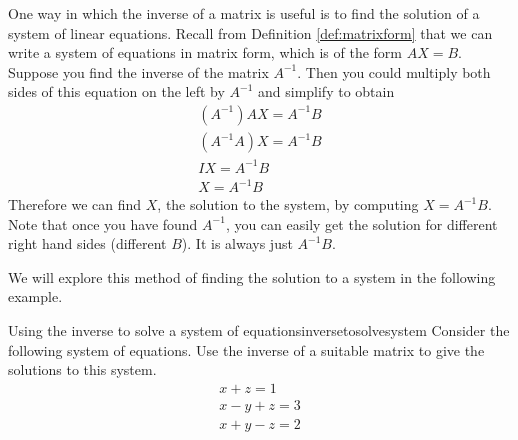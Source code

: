 One way in which the inverse of a matrix is useful is to find the solution of a system of linear equations.
Recall from Definition \ref{def:matrixform} that we can write a system of equations in matrix form, 
which is of the form $AX=B$. Suppose you find the
inverse of the matrix $A^{-1}$. Then you could multiply both sides of this
equation on the left by $A^{-1}$ and simplify to obtain
\begin{equation*}
\begin{array}{c}
\left( A^{-1} \right) AX =A^{-1}B \\
\left(A^{-1}A\right) X = A^{-1}B \\
IX = A^{-1}B \\
X = A^{-1}B
\end{array}
\end{equation*}
Therefore we can find $X$, the solution to the system, by computing $X=A^{-1}B$. 
Note that once you
have found $A^{-1}$, you can easily get the solution for different right
hand sides (different $B$). It is always just $A^{-1}B$. 
 
We will explore this method of finding the solution to a system in the following example. 

\begin{example}{Using the inverse to solve a system of equations}{inversetosolvesystem}
 Consider the following system of
equations. Use the inverse of a suitable matrix to give the solutions to
this system.
\begin{equation*}
\begin{array}{c}
x+z=1 \\
x-y+z=3 \\
x+y-z=2
\end{array}
\end{equation*}
\end{example}


